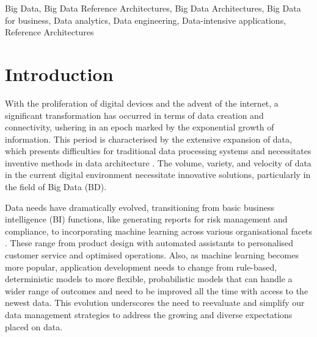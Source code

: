 \documentclass[journal]{IEEEtran}
\begin{document}
\begin{IEEEkeywords}
  Big Data, Big Data Reference Architectures, Big Data Architectures, Big Data for business, Data analytics, Data engineering, Data-intensive applications, Reference Architectures
\end{IEEEkeywords}






%
\IEEEpeerreviewmaketitle




\section{Introduction}
\label{sec:introduction} 

With the proliferation of digital devices and the advent of the internet, a significant transformation has occurred in terms of data creation and connectivity, ushering in an epoch marked by the exponential growth of information. This period is characterised by the extensive expansion of data, which presents difficulties for traditional data processing systems and necessitates inventive methods in data architecture \cite{AtaeiACIS, ataei2022state}. The volume, variety, and velocity of data in the current digital environment necessitate innovative solutions, particularly in the field of Big Data (BD).

Data needs have dramatically evolved, transitioning from basic business intelligence (BI) functions, like generating reports for risk management and compliance, to incorporating machine learning across various organisational facets \cite{ataei2023towards}. These range from product design with automated assistants to personalised customer service and optimised operations.  Also, as machine learning becomes more popular, application development needs to change from rule-based, deterministic models to more flexible, probabilistic models that can handle a wider range of outcomes and need to be improved all the time with access to the newest data. This evolution underscores the need to reevaluate and simplify our data management strategies to address the growing and diverse expectations placed on data.
\end{document}
